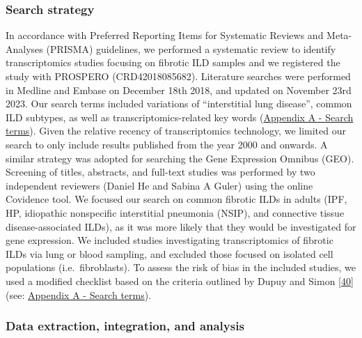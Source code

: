 \documentclass[
]{article}
\begin{document}
\hypertarget{search-strategy}{%
\subsubsection{Search strategy}\label{search-strategy}}

In accordance with Preferred Reporting Items for Systematic Reviews and Meta-Analyses (PRISMA) guidelines, we performed a systematic review to identify transcriptomics studies focusing on fibrotic ILD samples and we registered the study with PROSPERO (CRD42018085682). Literature searches were performed in Medline and Embase on December 18th 2018, and updated on November 23rd 2023. Our search terms included variations of ``interstitial lung disease'', common ILD subtypes, as well as transcriptomics-related key words (\protect\hyperlink{search-terms}{Appendix A - Search terms}). Given the relative recency of transcriptomics technology, we limited our search to only include results published from the year 2000 and onwards. A similar strategy was adopted for searching the Gene Expression Omnibus (GEO). Screening of titles, abstracts, and full-text studies was performed by two independent reviewers (Daniel He and Sabina A Guler) using the online Covidence tool. We focused our search on common fibrotic ILDs in adults (IPF, HP, idiopathic nonspecific interstitial pneumonia (NSIP), and connective tissue disease-associated ILDs), as it was more likely that they would be investigated for gene expression. We included studies investigating transcriptomics of fibrotic ILDs via lung or blood sampling, and excluded those focused on isolated cell populations (i.e.~fibroblasts). To assess the risk of bias in the included studies, we used a modified checklist based on the criteria outlined by Dupuy and Simon {[}\protect\hyperlink{ref-dupuy_critical_2007}{40}{]} (see: \protect\hyperlink{qc}{Appendix A - Search terms}).

\hypertarget{data-extraction-integration-and-analysis}{%
\subsubsection{Data extraction, integration, and analysis}\label{data-extraction-integration-and-analysis}}
\end{document}
